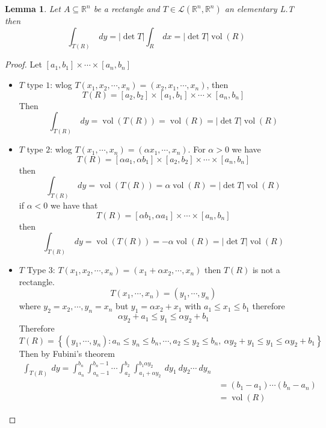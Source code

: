 \documentclass[11pt,a4paper]{article}
\theoremstyle{definition}
\theoremstyle{plain}
\newtheorem{lemma}[definition]{Lemma}
\theoremstyle{remark}
\newcommand{\R}{\mathbb{R}}
\renewcommand{\set}[1]{\left\{ #1 \right\}}
\newcommand{\abs}[1]{\lvert #1 \rvert}
\newcommand{\vol}{\operatorname{vol}}
\begin{document}
\begin{lemma}
    Let $A \subseteq \R^n$ be a rectangle and $T \in \mathcal{L}(\R^n, \R^n)$ an elementary L.T then 
    $$\int_{T(R)} \ dy = \abs{\det T } \int_R \ dx = \abs{\det T} \vol (R)$$
\end{lemma}

\begin{proof}
    Let $[a_1, b_1] \times \cdots \times [a_n,b_n]$
    \begin{itemize}
        \item $T$ type $1$: wlog $T(x_1, x_2, \cdots, x_n) = (x_2, x_1, \cdots, x_n)$, then 
        $$T(R) = [a_2, b_2] \times [a_1, b_1] \times \cdots \times [a_n, b_n]$$
        Then
        $$\int_{T(R)} \ dy = \vol (T(R)) = \vol (R) = \abs{\det T} \vol (R)$$

        \item $T$ type $2$: wlog $T(x_1, \cdots, x_n) = (\alpha x_1, \cdots, x_n)$. 
        For $\alpha > 0$ we have 
        $$T(R) = [\alpha a_1, \alpha b_1] \times [a_2, b_2] \times \cdots \times [a_n, b_n]$$
        then 
        $$\int_{T(R)} \ dy = \vol (T(R)) = \alpha \vol (R) = \abs{\det T} \vol (R)$$
        if $\alpha < 0$ we have that 
        $$T(R) = [\alpha b_1, \alpha a_1] \times \cdots \times [a_n, b_n]$$
        then 
        $$\int_{T(R)} \ dy = \vol (T(R)) = - \alpha \vol (R) = \abs{\det T} \vol (R)$$

        \item $T$ Type $3$: $T(x_1, x_2, \cdots, x_n) = (x_1 + \alpha x_2, \cdots, x_n)$ then $T(R)$ is not a rectangle. 
        $$T(x_1, \cdots, x_n) = (y_1, \cdots, y_n)$$
        where $y_2 = x_2, \cdots, y_n = x_n$ but $y_1 = \alpha x_2 + x_1$ with $a_1 \le x_1 \le b_1$ therefore 
        $$\alpha y_2 + a_1 \le y_1 \le \alpha y_2 + b_1$$
        Therefore $T(R) = \set{(y_1, \cdots, y_n) \colon a_n \le y_n \le b_n, \cdots, a_2 \le y_2 \le b_n, \ \alpha y_2 + y_1 \le y_1 \le \alpha y_2 + b_1}$
        Then by Fubini's theorem 
        \begin{align*}
            \int_{T(R)} \ dy = \int_{a_n}^{b_n} \int_{a_n-1}^{b_n-1} \cdots \int_{a_2}^{b_2} \int_{a_1 + \alpha y_2}^{b_1 \alpha y_2} \ d y_1 \ d y_2 \cdots \ dy_n \\
            &= (b_1-a_1) \cdots (b_n - a_n) \\
            &= \vol (R)
        \end{align*} 
    \end{itemize}
\end{proof}
\end{document}

